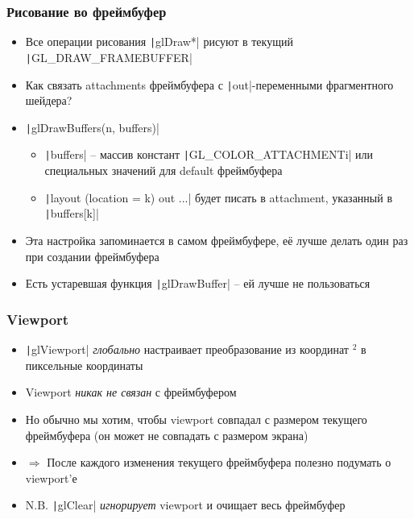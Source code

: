 \documentclass[10pt]{beamer}
\begin{document}
\begin{frame}[fragile]
\frametitle{Рисование во фреймбуфер}
\begin{itemize}
\item Все операции рисования \texttt|glDraw*| рисуют в текущий \texttt|GL_DRAW_FRAMEBUFFER|
\pause
\item Как связать attachments фреймбуфера с \texttt|out|-переменными фрагментного шейдера?
\pause
\item \texttt|glDrawBuffers(n, buffers)|
\begin{itemize}
\item \texttt|buffers| -- массив констант \texttt|GL_COLOR_ATTACHMENTi| или специальных значений для default фреймбуфера
\item \texttt|layout (location = k) out ...| будет писать в attachment, указанный в \texttt|buffers[k]|
\end{itemize}
\pause
\item Эта настройка запоминается в самом фреймбуфере, её лучше делать один раз при создании фреймбуфера
\pause
\item Есть устаревшая функция \texttt|glDrawBuffer| -- ей лучше не пользоваться
\end{itemize}
\end{frame}

\begin{frame}[fragile]
\frametitle{Viewport}
\begin{itemize}
\item \texttt|glViewport| \textit{глобально} настраивает преобразование из координат \begin{math}[-1, 1]^2\end{math} в пиксельные координаты
\pause
\item Viewport \textit{никак не связан} с фреймбуфером
\pause
\item Но обычно мы хотим, чтобы viewport совпадал с размером текущего фреймбуфера (он может не совпадать с размером экрана)
\pause
\item \begin{math}\Longrightarrow\end{math} После каждого изменения текущего фреймбуфера полезно подумать о viewport'е
\pause
\item N.B. \texttt|glClear| \textit{игнорирует} viewport и очищает весь фреймбуфер
\end{itemize}
\end{frame}
\end{document}
